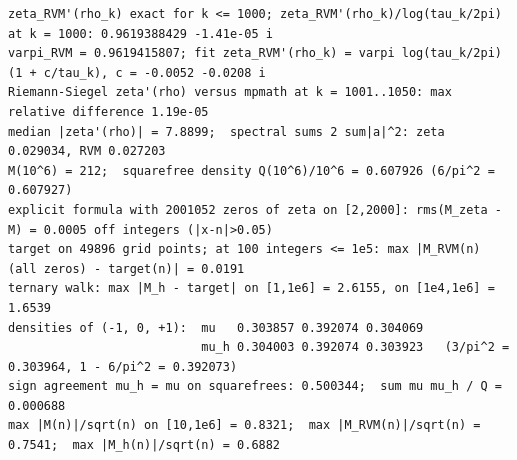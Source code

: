 \documentclass[11pt,reqno]{amsart}
\numberwithin{equation}{section}
\theoremstyle{plain}
\theoremstyle{definition}
\theoremstyle{remark}
\begin{document}
\begin{lstlisting}[style=out]
zeta_RVM'(rho_k) exact for k <= 1000; zeta_RVM'(rho_k)/log(tau_k/2pi) at k = 1000: 0.9619388429 -1.41e-05 i
varpi_RVM = 0.9619415807; fit zeta_RVM'(rho_k) = varpi log(tau_k/2pi)(1 + c/tau_k), c = -0.0052 -0.0208 i
Riemann-Siegel zeta'(rho) versus mpmath at k = 1001..1050: max relative difference 1.19e-05
median |zeta'(rho)| = 7.8899;  spectral sums 2 sum|a|^2: zeta 0.029034, RVM 0.027203
M(10^6) = 212;  squarefree density Q(10^6)/10^6 = 0.607926 (6/pi^2 = 0.607927)
explicit formula with 2001052 zeros of zeta on [2,2000]: rms(M_zeta - M) = 0.0005 off integers (|x-n|>0.05)
target on 49896 grid points; at 100 integers <= 1e5: max |M_RVM(n) (all zeros) - target(n)| = 0.0191
ternary walk: max |M_h - target| on [1,1e6] = 2.6155, on [1e4,1e6] = 1.6539
densities of (-1, 0, +1):  mu   0.303857 0.392074 0.304069
                           mu_h 0.304003 0.392074 0.303923   (3/pi^2 = 0.303964, 1 - 6/pi^2 = 0.392073)
sign agreement mu_h = mu on squarefrees: 0.500344;  sum mu mu_h / Q = 0.000688
max |M(n)|/sqrt(n) on [10,1e6] = 0.8321;  max |M_RVM(n)|/sqrt(n) = 0.7541;  max |M_h(n)|/sqrt(n) = 0.6882


\end{lstlisting}
\end{document}
